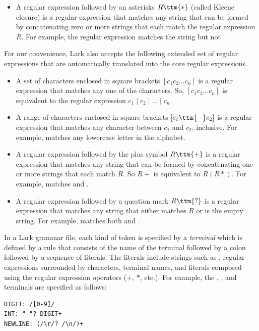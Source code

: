\documentclass[7x10]{TimesAPriori_MIT}%
\numberwithin{theorem}{chapter}
\numberwithin{definition}{chapter}
\numberwithin{equation}{chapter}
\begin{document}
{\begin{itemize}
\item A regular expression followed by an asterisks $R\ttm{*}$ (called
  Kleene closure) is a regular expression that matches any string that
  can be formed by concatenating zero or more strings that each match
  the regular expression $R$.  For example, the regular expression
   matches the string  but not
  .
\end{itemize}

For our convenience, Lark also accepts the following extended set of
regular expressions that are automatically translated into the core
regular expressions.

\begin{itemize}
\item A set of characters enclosed in square brackets $[c_1 c_2 \ldots
  c_n]$ is a regular expression that matches any one of the
  characters. So, $[c_1 c_2 \ldots c_n]$  is equivalent to
  the regular expression $c_1\mid c_2\mid \ldots \mid c_n$.
\item A range of characters enclosed in square brackets $[c_1\ttm{-}c_2]$ is
  a regular expression that matches any character between $c_1$ and
  $c_2$, inclusive. For example, \code{[a-z]} matches any lowercase
  letter in the alphabet.
\item A regular expression followed by the plus symbol $R\ttm{+}$
  is a regular expression that matches any string that can
  be formed by concatenating one or more strings that each match $R$.
  So $R+$ is equivalent to $R(R*)$. For example, \code{[a-z]+}
  matches  and .
\item A regular expression followed by a question mark $R\ttm{?}$
  is a regular expression that matches any string that either
  matches $R$ or is the empty string.
  For example,   matches both  and .
\end{itemize}

In a Lark grammar file, each kind of token is specified by a
\emph{terminal} which is defined by a rule
that consists of the name of the terminal followed by a colon followed
by a sequence of literals.  The literals include strings such as
, regular expressions surrounded by \code{/} characters,
terminal names, and literals composed using the regular expression
operators ($+$, $*$, etc.).  For example, the ,
, and  terminals are specified as follows:
\begin{center}
\begin{minipage}{0.95\textwidth}
\begin{lstlisting}
DIGIT: /[0-9]/
INT: "-"? DIGIT+
NEWLINE: (/\r/? /\n/)+
\end{lstlisting}
\end{minipage}
\end{center}


}
\end{document}
